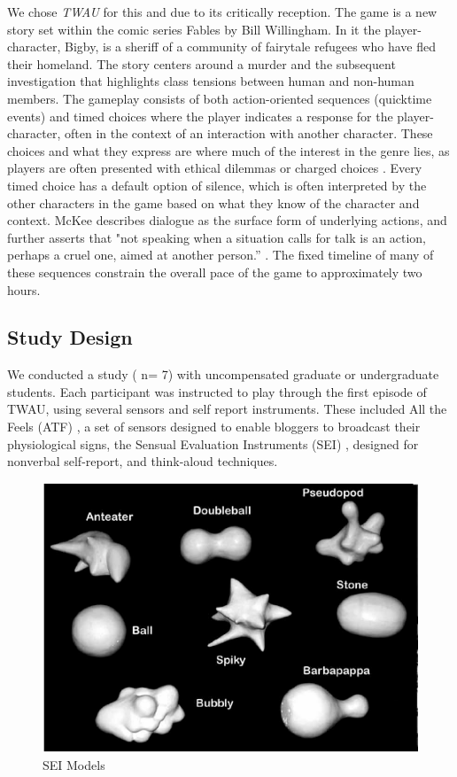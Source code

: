 We chose \emph{TWAU} for this and due to its critically reception. The game
is a new story set within the comic series Fables by Bill
Willingham. In it the player-character, Bigby, is a sheriff of a
community of fairytale refugees who have fled their homeland. The
story centers around a murder and the subsequent investigation that
highlights class tensions between human and non-human members. The
gameplay consists of both action-oriented sequences (quicktime events)
and timed choices where the player indicates a response for the
player-character, often in the context of an interaction with another
character. These choices and what they express are where much of the
interest in the genre lies, as players are often presented with
ethical dilemmas or charged choices \cite{Nay2017-nt}. Every timed
choice has a default option of silence, which is often interpreted by
the other characters in the game based on what they know of the
character and context. McKee describes dialogue as the surface form of
underlying actions, and further asserts that "not speaking when a
situation calls for talk is an action, perhaps a cruel one, aimed at
another person.”  \cite{Mckee2016-vm}. The fixed timeline of many of
these sequences constrain the overall pace of the game to
approximately two hours.

\subsection{Study Design}
\label{sec:org61d90f3}
We conducted a study ( n= 7) with uncompensated graduate or
undergraduate students. Each participant was instructed to play
through the first episode of TWAU, using several sensors and self
report instruments. These included All the Feels (ATF)
\cite{Robinson2016-qr}, a set of sensors designed to enable bloggers
to broadcast their physiological signs, the Sensual Evaluation
Instruments (SEI) \cite{Isbister2006-sc,Laaksolahti2009-uw}, designed
for nonverbal self-report, and think-aloud techniques. 

\begin{figure}[htbp]
\centering
\includegraphics[width=.9\linewidth]{figures/sei.PNG}
\caption{\label{fig:org5b60ba7}
SEI Models}
\end{figure}

